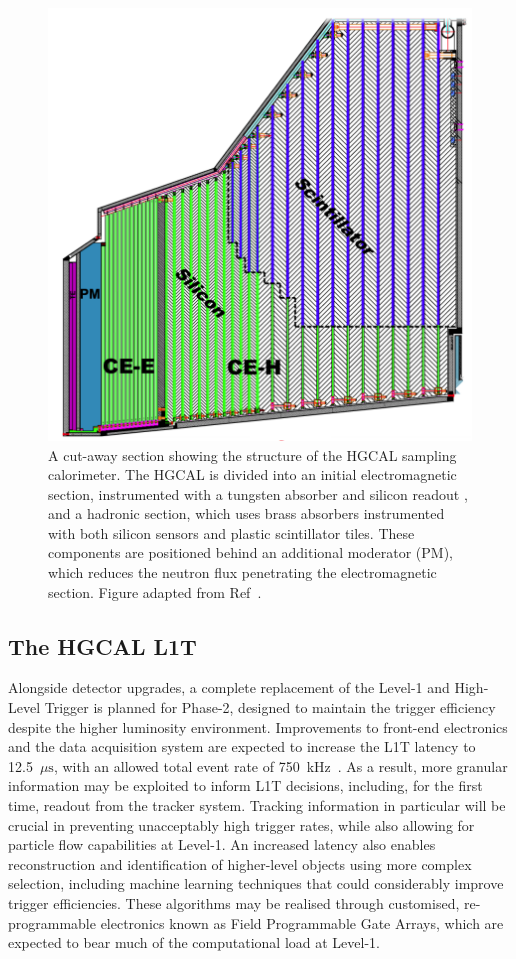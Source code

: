 \begin{figure}[htbp!]
\centering
\includegraphics[width =0.5\linewidth]{Figures/Detector/HGCAL/Misc/HGCAL.png}\hfill
\caption[The CMS High Granularity Calorimeter.]{A cut-away section showing the structure of the HGCAL sampling calorimeter. The HGCAL is divided into an initial electromagnetic section, instrumented with a tungsten absorber and silicon readout , and a hadronic section, which uses brass absorbers instrumented with both silicon sensors and plastic scintillator tiles. These components are positioned behind an additional moderator (PM), which reduces the neutron flux penetrating the electromagnetic section. Figure adapted from Ref~\cite{CMS_phase2_HGCAL}.}%
\label{fig:cms_HGCAL}
\end{figure}



\subsection{The HGCAL L1T}

Alongside detector upgrades, a complete replacement of the Level-1 and High-Level Trigger is planned for Phase-2, designed to maintain the trigger efficiency despite the higher luminosity environment. Improvements to front-end electronics and the data acquisition system are expected to increase the L1T latency to 12.5~$\mu\mathrm{s}$, with an allowed total event rate of 750~kHz~\cite{CMS_phase2_L1T}. As a result, more granular information may be exploited to inform L1T decisions, including, for the first time, readout from the tracker system. Tracking information in particular will be crucial in preventing unacceptably high trigger rates, while also allowing for particle flow capabilities at Level-1. An increased latency also enables reconstruction and identification of higher-level objects using more complex selection, including machine learning techniques that could considerably improve trigger efficiencies. These algorithms may be realised through customised, re-programmable electronics known as Field Programmable Gate Arrays, which are expected to bear much of the computational load at Level-1.

